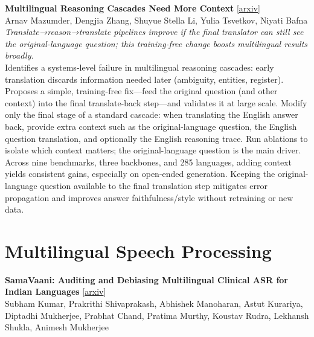 \documentclass[12pt,letterpaper]{article}
\begin{document}
\medskip

{\small\textbf{Multilingual Reasoning Cascades Need More Context}} {\scriptsize[\href{https://arxiv.org/abs/2606.27306}{arxiv}]}\\
{\scriptsize Arnav Mazumder, Dengjia Zhang, Shuyue Stella Li, Yulia Tsvetkov, Niyati Bafna}\\

{\small\textit{Translate→reason→translate pipelines improve if the final translator can still see the original-language question; this training-free change boosts multilingual results broadly.}}\\[1pt]
{\footnotesize Identifies a systems-level failure in multilingual reasoning cascades: early translation discards information needed later (ambiguity, entities, register). Proposes a simple, training-free fix---feed the original question (and other context) into the final translate-back step---and validates it at large scale. Modify only the final stage of a standard cascade: when translating the English answer back, provide extra context such as the original-language question, the English question translation, and optionally the English reasoning trace. Run ablations to isolate which context matters; the original-language question is the main driver. Across nine benchmarks, three backbones, and 285 languages, adding context yields consistent gains, especially on open-ended generation. Keeping the original-language question available to the final translation step mitigates error propagation and improves answer faithfulness/style without retraining or new data.}

\medskip


\section*{Multilingual Speech Processing}

{\small\textbf{SamaVaani: Auditing and Debiasing Multilingual Clinical ASR for Indian Languages}} {\scriptsize[\href{https://arxiv.org/abs/2606.26901}{arxiv}]}\\
{\scriptsize Subham Kumar, Prakrithi Shivaprakash, Abhishek Manoharan, Astut Kurariya, Diptadhi Mukherjee, Prabhat Chand, Pratima Murthy, Koustav Rudra, Lekhansh Shukla, Animesh Mukherjee}\\
\end{document}
